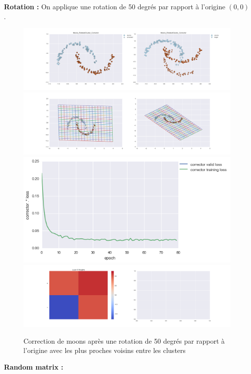 
{\Large \textbf{Rotation :}} On applique une rotation de 50 degrés par rapport à l'origine $(0,0)$.

\begin{figure}[H] %
\centering
\includegraphics[width=\linewidth]{fig/24-05-2016/moons/Moons_RotatedCluster_Corrector-DATA.png}
\includegraphics[width=\linewidth]{fig/24-05-2016/moons/Moons_RotatedCluster_Corrector-GridCheck.png}
\includegraphics[width=0.45\linewidth]{fig/24-05-2016/moons/Moons_RotatedCluster_Corrector-Learning_curve.png}
\includegraphics[width=\linewidth]{fig/24-05-2016/moons/Moons_RotatedCluster_Corrector-W.png}
\caption{Correction de moons après une rotation de 50 degrés par rapport à l'origine avec les plus proches voisins entre les clusters}
\label{fig:recap-moons-rot-cluster}
\end{figure}

{\Large \textbf{Random matrix :}}

